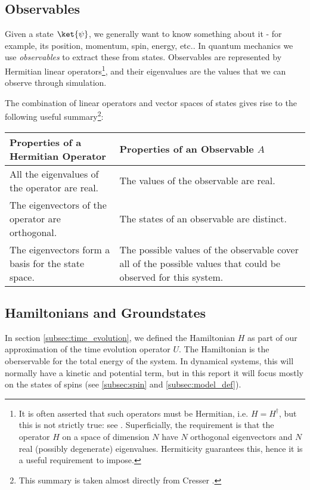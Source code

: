 \subsection{Observables}\label{subsec:observables}
Given a state $\ket{\psi}$, we generally want to know something about it - for example, its position, momentum, spin, energy, etc.. In quantum mechanics we use \textit{observables} to extract these from states. 
Observables are represented by Hermitian linear operators\footnote{It is often asserted that such operators must be Hermitian, i.e. $H = H^\dagger$, but this is not strictly true: see \cite{bender_hermitian}. Superficially, the requirement is that the operator $H$ on a space of dimension $N$ have $N$ orthogonal eigenvectors and $N$ real (possibly degenerate) eigenvalues. Hermiticity guarantees this, hence it is a useful requirement to impose.}, and their eigenvalues are the values that we can observe through simulation. 

 The combination of linear operators and vector spaces of states gives rise to the following useful summary\footnote{This summary is taken almost directly from Cresser \cite{cresser}.}: 

\begin{center}\label{table:quantum}
	\begin{tabularx}{1.\textwidth}{| X | X |}
\hline 
\textbf{Properties of a Hermitian Operator} & \textbf{Properties of an Observable $A$}\\
\hline
All the eigenvalues of the operator are real. & The values of the observable are real. \\ 
\hline
The eigenvectors of the operator are orthogonal. & The states of an observable are distinct. \\
\hline
The eigenvectors form a basis for the state space. & The possible values of the observable cover all of the possible values that could be observed for this system.  \\
\hline
	
\end{tabularx}
\end{center}

\subsection{Hamiltonians and Groundstates}\label{subsec:hamiltonians}
In section \ref{subsec:time_evolution}, we defined the Hamiltonian $H$ as part of our approximation of the time evolution operator $U$. The Hamiltonian is the oberservable for the total energy of the system. In dynamical systems, this will normally have a kinetic and potential term, but in this report it will focus mostly on the states of spins (see \ref{subsec:spin} and \ref{subsec:model_def}).

